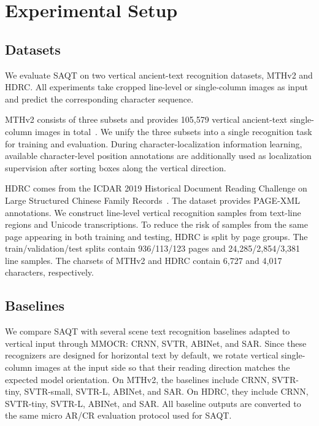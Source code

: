 \section{Experimental Setup}

\subsection{Datasets}

We evaluate SAQT on two vertical ancient-text recognition datasets, MTHv2 and HDRC. All experiments take cropped line-level or single-column images as input and predict the corresponding character sequence.

MTHv2 consists of three subsets and provides 105,579 vertical ancient-text single-column images in total~\cite{tang2020hrcenternet}. We unify the three subsets into a single recognition task for training and evaluation. During character-localization information learning, available character-level position annotations are additionally used as localization supervision after sorting boxes along the vertical direction.

HDRC comes from the ICDAR 2019 Historical Document Reading Challenge on Large Structured Chinese Family Records~\cite{saini2019hdrc}. The dataset provides PAGE-XML annotations. We construct line-level vertical recognition samples from text-line regions and Unicode transcriptions. To reduce the risk of samples from the same page appearing in both training and testing, HDRC is split by page groups. The train/validation/test splits contain 936/113/123 pages and 24,285/2,854/3,381 line samples. The charsets of MTHv2 and HDRC contain 6,727 and 4,017 characters, respectively.

\subsection{Baselines}

We compare SAQT with several scene text recognition baselines adapted to vertical input through MMOCR: CRNN, SVTR, ABINet, and SAR. Since these recognizers are designed for horizontal text by default, we rotate vertical single-column images at the input side so that their reading direction matches the expected model orientation. On MTHv2, the baselines include CRNN, SVTR-tiny, SVTR-small, SVTR-L, ABINet, and SAR. On HDRC, they include CRNN, SVTR-tiny, SVTR-L, ABINet, and SAR. All baseline outputs are converted to the same micro AR/CR evaluation protocol used for SAQT.

